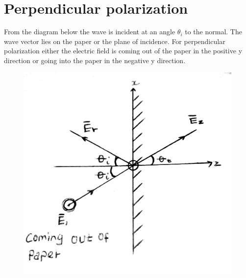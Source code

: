 \section{Perpendicular polarization} 
From the diagram below the wave is incident at an angle $\theta_{i}$ to the normal. The wave vector lies on the paper or the plane of incidence. For perpendicular polarization either the electric field is coming out of the paper in the positive y direction or going into the paper in the negative y direction.
\begin{figure}[h]
\centering
\includegraphics[width=1\linewidth]{./graphics/12}
\caption{}
\label{fig:12}
\end{figure}

